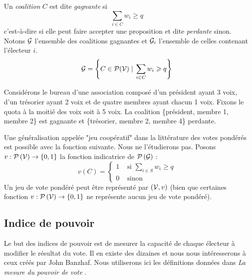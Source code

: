 \begin{definition}
	Un \textit{coalition} $C$ est dite \textit{gagnante} si
	\begin{equation}
		\sum_{i \in C} w_i \geqslant q
	\end{equation}
	c'est-à-dire si elle peut faire accepter une proposition et dite \textit{perdante} sinon.
	Notons $\mathcal{G}$ l'ensemble des coalitions gagnantes et $\mathcal{G}_i$ l'ensemble de celles contenant l'électeur $i$.
	\begin{equation}
		\mathcal{G} = \left\{ C \in \mathcal{P}(\mathcal{V}) \;|\; \sum_{i \in C} w_i \geqslant q \right\}
	\end{equation}
\end{definition}

\begin{exemple}
	Considérons le bureau d'une association composé d'un président ayant 3 voix, d'un trésorier ayant 2 voix et de quatre membres ayant chacun 1 voix. Fixons le quota à la moitié des voix soit à 5 voix.
	La coalition \{président, membre 1, membre 2\} est gagnante et \{trésorier, membre 2, membre 4\} perdante.
\end{exemple}

Une généralisation appelée "jeu coopératif" dans la littérature des votes pondérés est possible avec la fonction suivante. Nous ne l'étudierons pas.
Posons $v : \mathcal{P}\left(\mathcal{V}\right) \rightarrow \left\{0,1\right\}$ la fonction indicatrice de $\mathcal{P}\left(\mathcal{G}\right)$ :
\begin{equation*}
	v(C) = \left\{ \begin{array}{cl}
		1 &\text{ si } \sum_{i \in S} w_i \geqslant q \\
		0 &\text{ sinon}
	\end{array} \right.
\end{equation*}
Un jeu de vote pondéré peut être représenté par $(\mathcal{V}, v)$ (bien que certaines fonction $v : \mathcal{P}\left(\mathcal{V}\right) \rightarrow \left\{0,1\right\}$ ne représente aucun jeu de vote pondéré).


\subsection{Indice de pouvoir}

Le but des indices de pouvoir est de mesurer la capacité de chaque électeur à modifier le résultat du vote. Il en existe des dizaines et nous nous intéresserons à ceux créés par John Banzhaf. Nous utiliserons ici les définitions données dans \textit{La mesure du pouvoir de vote} \cite{mesure_pouvoir}.

